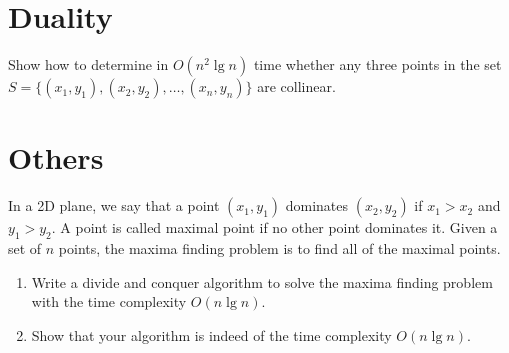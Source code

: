 \section{Duality}
\begin{Exercise}
Show how to determine in $O(n^2 \lg n)$ time whether any three points in the set $S = \{(x_1, y_1), (x_2, y_2), \dots, (x_n, y_n)\}$ are collinear. 
\end{Exercise}
\begin{Answer}
\end{Answer}

\section{Others}

\begin{Exercise}
In a 2D plane, we say that a point $(x_1, y_1)$ dominates $(x_2, y_2)$ if $x_1 > x_2$ and $y_1 > y_2$. A point is called maximal point if no other point dominates it. Given a set of $n$ points, the maxima finding problem is to find all of the maximal points.
\begin{enumerate}
\item Write a divide and conquer algorithm to solve the maxima finding problem with the time complexity $O(n \lg n)$.
\item Show that your algorithm is indeed of the time complexity $O(n \lg n)$. 
\end{enumerate}
\end{Exercise}
\begin{Answer}
\end{Answer}



\printbibliography[heading=subbibliography]
